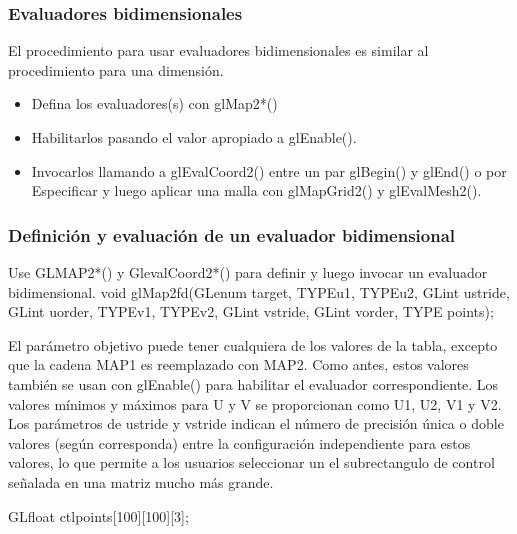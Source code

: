 \documentclass[10.5pt]{beamer}
\begin{document}
\begin{frame}[fragile]
    \frametitle{Evaluadores bidimensionales}

El procedimiento para usar evaluadores bidimensionales es similar al procedimiento para una dimensión.

\begin{itemize}
    \item Defina los evaluadores(s) con glMap2*()
    \item Habilitarlos pasando el valor apropiado a glEnable().
    \item Invocarlos llamando a glEvalCoord2() entre un par glBegin() y glEnd() o por
    Especificar y luego aplicar una malla con glMapGrid2() y glEvalMesh2().
\end{itemize}


\end{frame}
\begin{frame}[fragile]
    \frametitle{Definición y evaluación de un evaluador bidimensional}

    Use GLMAP2*() y GlevalCoord2*() para definir y luego invocar un evaluador bidimensional.
    void glMap2{fd}(GLenum target, TYPEu1, TYPEu2, GLint ustride,
    GLint uorder, TYPEv1, TYPEv2, GLint vstride,
    GLint vorder, TYPE points);

    El parámetro objetivo puede tener cualquiera de los valores de la tabla, excepto que la cadena MAP1 es
    reemplazado con MAP2. Como antes, estos valores también se usan con glEnable() para habilitar el
    evaluador correspondiente. Los valores mínimos y máximos para U y V se proporcionan como U1, U2,
    V1 y V2. Los parámetros de ustride y vstride indican el número de precisión única o doble
    valores (según corresponda) entre la configuración independiente para estos valores,
    lo que permite a los usuarios seleccionar un
    el subrectangulo de control señalada en  una matriz mucho más grande.
    \begin{alertblock}{}
        \small
        \center
            GLfloat ctlpoints[100][100][3];
    \end{alertblock}
\end{frame}
\end{document}
